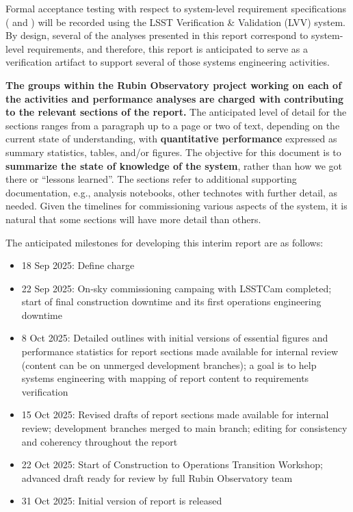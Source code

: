 Formal acceptance testing with respect to system-level requirement specifications ( and ) will be recorded using the LSST Verification \& Validation (LVV) system.
By design, several of the analyses presented in this report correspond to system-level requirements, and therefore, this report is anticipated to serve as a verification artifact to support several of those systems engineering activities.

\textbf{The groups within the Rubin Observatory project working on each of the activities and performance analyses are charged with contributing to the relevant sections of the report.}
The anticipated level of detail for the sections ranges from a paragraph up to a page or two of text, depending on the current state of understanding, with \textbf{quantitative performance} expressed as summary statistics, tables, and/or figures.
The objective for this document is to \textbf{summarize the state of knowledge of the system}, rather than how we got there or ``lessons learned''.
The sections refer to additional supporting documentation, e.g., analysis notebooks, other technotes with further detail, as needed.
Given the timelines for commissioning various aspects of the system, it is natural that some sections will have more detail than others.

The anticipated milestones for developing this interim report are as follows:

\begin{itemize}

    \item 18 Sep 2025: Define charge

    \item 22 Sep 2025: On-sky commissioning campaing with LSSTCam completed; start of final construction downtime and its first operations engineering downtime

    \item 8 Oct 2025: Detailed outlines with initial versions of essential figures and performance statistics for report sections made available for internal review (content can be on unmerged development branches); a goal is to help systems engineering with mapping of report content to requirements verification

    \item 15 Oct 2025: Revised drafts of report sections made available for internal review; development branches merged to main branch; editing for consistency and coherency throughout the report

    \item 22 Oct 2025: Start of Construction to Operations Transition Workshop; advanced draft ready for review by full Rubin Observatory team

    \item 31 Oct 2025: Initial version of report is released

\end{itemize}